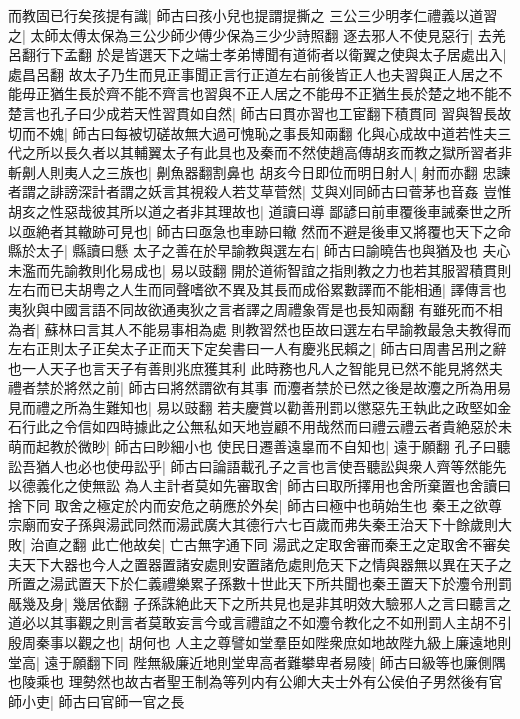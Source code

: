 而教固已行矣孩提有識|{
	師古曰孩小兒也提謂提撕之}
三公三少明孝仁禮義以道習之|{
	太師太傅太保為三公少師少傅少保為三少少詩照翻}
逐去邪人不使見惡行|{
	去羌呂翻行下孟翻}
於是皆選天下之端士孝弟博聞有道術者以衛翼之使與太子居處出入|{
	處昌呂翻}
故太子乃生而見正事聞正言行正道左右前後皆正人也夫習與正人居之不能毋正猶生長於齊不能不齊言也習與不正人居之不能毋不正猶生長於楚之地不能不楚言也孔子曰少成若天性習貫如自然|{
	師古曰貫亦習也工宦翻下積貫同}
習與智長故切而不媿|{
	師古曰每被切磋故無大過可愧恥之事長知兩翻}
化與心成故中道若性夫三代之所以長久者以其輔翼太子有此具也及秦而不然使趙高傳胡亥而教之獄所習者非斬劓人則夷人之三族也|{
	劓魚器翻割鼻也}
胡亥今日即位而明日射人|{
	射而亦翻}
忠諫者謂之誹謗深計者謂之妖言其視殺人若艾草菅然|{
	艾與刈同師古曰菅茅也音姦}
豈惟胡亥之性惡哉彼其所以道之者非其理故也|{
	道讀曰導}
鄙諺曰前車覆後車誡秦世之所以亟絶者其轍跡可見也|{
	師古曰亟急也車跡曰轍}
然而不避是後車又將覆也天下之命縣於太子|{
	縣讀曰懸}
太子之善在於早諭教與選左右|{
	師古曰諭曉告也與猶及也}
夫心未濫而先諭教則化易成也|{
	易以豉翻}
開於道術智誼之指則教之力也若其服習積貫則左右而已夫胡粤之人生而同聲嗜欲不異及其長而成俗累數譯而不能相通|{
	譯傳言也夷狄與中國言語不同故欲通夷狄之言者譯之周禮象胥是也長知兩翻}
有雖死而不相為者|{
	蘇林曰言其人不能易事相為處}
則教習然也臣故曰選左右早諭教最急夫教得而左右正則太子正矣太子正而天下定矣書曰一人有慶兆民賴之|{
	師古曰周書呂刑之辭也一人天子也言天子有善則兆庶獲其利}
此時務也凡人之智能見已然不能見將然夫禮者禁於將然之前|{
	師古曰將然謂欲有其事}
而灋者禁於已然之後是故灋之所為用易見而禮之所為生難知也|{
	易以豉翻}
若夫慶賞以勸善刑罰以懲惡先王執此之政堅如金石行此之令信如四時據此之公無私如天地豈顧不用哉然而曰禮云禮云者貴絶惡於未萌而起教於微眇|{
	師古曰眇細小也}
使民日遷善遠辠而不自知也|{
	遠于願翻}
孔子曰聽訟吾猶人也必也使毋訟乎|{
	師古曰論語載孔子之言也言使吾聽訟與衆人齊等然能先以德義化之使無訟}
為人主計者莫如先審取舍|{
	師古曰取所擇用也舍所棄置也舍讀曰捨下同}
取舍之極定於内而安危之萌應於外矣|{
	師古曰極中也萌始生也}
秦王之欲尊宗廟而安子孫與湯武同然而湯武廣大其德行六七百歲而弗失秦王治天下十餘歲則大敗|{
	治直之翻}
此亡他故矣|{
	亡古無字通下同}
湯武之定取舍審而秦王之定取舍不審矣夫天下大器也今人之置器置諸安處則安置諸危處則危天下之情與器無以異在天子之所置之湯武置天下於仁義禮樂累子孫數十世此天下所共聞也秦王置天下於灋令刑罰旤幾及身|{
	幾居依翻}
子孫誅絶此天下之所共見也是非其明效大驗邪人之言曰聽言之道必以其事觀之則言者莫敢妄言今或言禮誼之不如灋令教化之不如刑罰人主胡不引殷周秦事以觀之也|{
	胡何也}
人主之尊譬如堂羣臣如陛衆庶如地故陛九級上廉遠地則堂高|{
	遠于願翻下同}
陛無級廉近地則堂卑高者難攀卑者易陵|{
	師古曰級等也廉側隅也陵乘也}
理勢然也故古者聖王制為等列内有公卿大夫士外有公侯伯子男然後有官師小吏|{
	師古曰官師一官之長}
